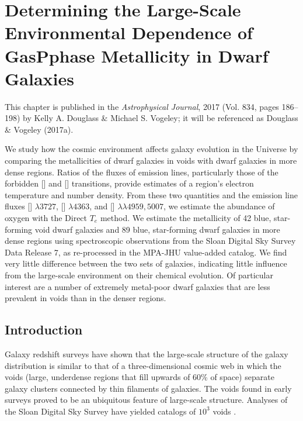 \chapter[Metallicity of Dwarf Galaxies]{Determining the Large-Scale Environmental Dependence of GasPphase Metallicity in Dwarf Galaxies}\label{ch:Paper1}

This chapter is published in the \emph{Astrophysical Journal}, 2017 (Vol. 834, 
pages 186--198) by Kelly A. Douglass \& Michael S. Vogeley; it will be 
referenced as Douglass \& Vogeley (2017a).


\begin{chapabstract}
We study how the cosmic environment affects galaxy evolution in the Universe by 
comparing the metallicities of dwarf galaxies in voids with dwarf galaxies in 
more dense regions.  Ratios of the fluxes of emission lines, particularly those 
of the forbidden [] and [] transitions, provide estimates of 
a region's electron temperature and number density.  From these two quantities 
and the emission line fluxes [] $\lambda 3727$, [] 
$\lambda 4363$, and [] $\lambda \lambda 4959,5007$, we estimate the 
abundance of oxygen with the Direct $T_e$ method.  We estimate the metallicity 
of 42 blue, star-forming void dwarf galaxies and 89 blue, star-forming dwarf 
galaxies in more dense regions using spectroscopic observations from the Sloan 
Digital Sky Survey Data Release 7, as re-processed in the MPA-JHU value-added 
catalog.  We find very little difference between the two sets of galaxies, 
indicating little influence from the large-scale environment on their chemical 
evolution.  Of particular interest are a number of extremely metal-poor dwarf 
galaxies that are less prevalent in voids than in the denser regions.
\end{chapabstract}


\section{Introduction}


Galaxy redshift surveys have shown that the large-scale structure of the galaxy 
distribution is similar to that of a three-dimensional cosmic web \citep{Bond96} 
in which the voids (large, underdense regions that fill upwards of 60\% of 
space) separate galaxy clusters connected by thin filaments of galaxies.  The 
voids found in early surveys \citep[e.g.,][]{Gregory78, Kirshner81, 
deLapparent86} proved to be an ubiquitous feature of large-scale structure.  
Analyses of the Sloan Digital Sky Survey \citep{Abazajian09, Ahn12} have yielded 
catalogs of $10^3$ voids \citep{Pan12, Sutter14}.

